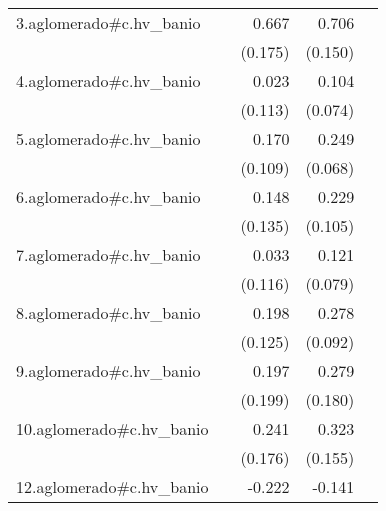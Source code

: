 {\begin{longtable}{l*{4}{D{.}{.}{-1}}}
\addlinespace
3.aglomerado#c.hv\_banio&                     &       0.667\sym{***}&       0.706\sym{***}&                     \\
            &                     &     (0.175)         &     (0.150)         &                     \\
\addlinespace
4.aglomerado#c.hv\_banio&                     &       0.023         &       0.104         &                     \\
            &                     &     (0.113)         &     (0.074)         &                     \\
\addlinespace
5.aglomerado#c.hv\_banio&                     &       0.170         &       0.249\sym{***}&                     \\
            &                     &     (0.109)         &     (0.068)         &                     \\
\addlinespace
6.aglomerado#c.hv\_banio&                     &       0.148         &       0.229\sym{*}  &                     \\
            &                     &     (0.135)         &     (0.105)         &                     \\
\addlinespace
7.aglomerado#c.hv\_banio&                     &       0.033         &       0.121         &                     \\
            &                     &     (0.116)         &     (0.079)         &                     \\
\addlinespace
8.aglomerado#c.hv\_banio&                     &       0.198         &       0.278\sym{**} &                     \\
            &                     &     (0.125)         &     (0.092)         &                     \\
\addlinespace
9.aglomerado#c.hv\_banio&                     &       0.197         &       0.279         &                     \\
            &                     &     (0.199)         &     (0.180)         &                     \\
\addlinespace
10.aglomerado#c.hv\_banio&                     &       0.241         &       0.323\sym{*}  &                     \\
            &                     &     (0.176)         &     (0.155)         &                     \\
\addlinespace
12.aglomerado#c.hv\_banio&                     &      -0.222         &      -0.141         &                     \\

\end{longtable}}

